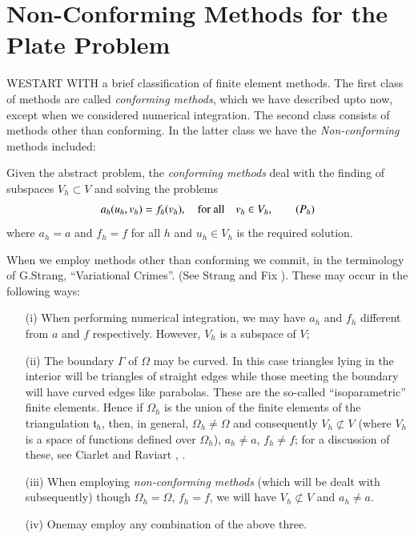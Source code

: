 
\chapter{Non-Conforming Methods for the Plate Problem}\label{chap11}

WE\pageoriginale START WITH a brief classification of finite element
methods. The first class of methods are called {\em conforming
  methods}, which we have described upto now, except when we
considered numerical integration. The second class consists of methods
other than conforming. In the latter class we have the {\em
  Non-conforming} methods included:

Given the abstract problem, the {\em conforming methods} deal with the
finding of subspaces $V_{h}\subset V$ and solving the problems
\begin{equation*}
a_{h}(u_{h},v_{h})=f_{h}(v_{h}),\quad\text{for all}\quad v_{h}\in
V_{h},\tag*{$(P_{h})$} 
\end{equation*}
where $a_{h}=a$ and $f_{h}=f$ for all $h$ and $u_{h}\in V_{h}$ is the
required solution.

When we employ methods other than conforming we commit, in the
terminology of G.\@ Strang, ``Variational Crimes''. (See Strang and
Fix \cite{key22}). These may occur in the following ways:
\begin{itemize}
\item[(i)] When performing numerical integration, we may have $a_{h}$
  and $f_{h}$ different from $a$ and $f$ respectively. However,
  $V_{h}$ is a subspace of $V$;

\item[(ii)] The boundary $\Gamma$ of $\Omega$ may be curved. In this
  case triangles lying in the interior will be triangles of straight
  edges while those meeting the boundary will have curved edges like
  parabolas. These are the so-called ``isoparametric'' finite
  elements. Hence if $\Omega_{h}$ is the union of the finite elements
  of the triangulation $\mathfrak{t}_{h}$, then, in general,
  $\Omega_{h}\neq \Omega$ and consequently $V_{h}\not\subset V$ (where
  $V_{h}$ is a space of functions defined over $\Omega_{h}$),
  $a_{h}\neq a$, $f_{h}\neq f$; for a discussion of these, see Ciarlet
  and Raviart \cite{key30}, \cite{key31}.

\item[(iii)] When employing {\em non-conforming methods} (which will
  be dealt with subsequently) though $\Omega_{h}=\Omega$, $f_{h}=f$,
  we will have $V_{h}\not\subset V$ and $a_{h}\neq a$.

\item[(iv)] One\pageoriginale may employ any combination of the above three.
\end{itemize}


